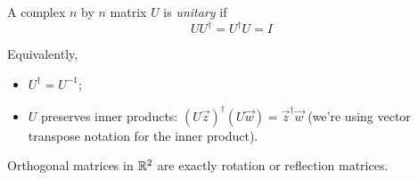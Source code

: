 \documentclass{../template/note}
\begin{document}
    \begin{definition}
        A complex \(n\) by \(n\) matrix \(U\) is \emph{unitary} if
        \[
            UU^\dagger = U^\dagger U = I
        \]
    \end{definition}
    Equivalently,
    \begin{itemize}
        \item \(U^\dagger = U^{-1}\);
        \item \(U\) preserves inner products: \((U \vec z)^\dagger (U \vec w) = \vec z^\dagger \vec w\) (we're using vector transpose notation for the inner product).
    \end{itemize}
    
    \begin{lemma}
        Orthogonal matrices in \(\mathbb R^2\) are exactly rotation or reflection matrices.
    \end{lemma}
    
\end{document}
